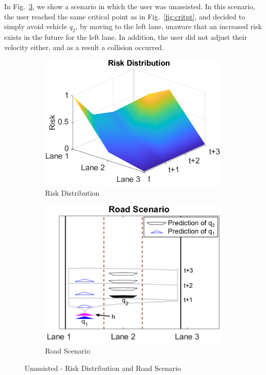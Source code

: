\documentclass[letterpaper, 10 pt, conference]{ieeeconf}  %
\begin{document}
In Fig.~\ref{fig:noassist}, we show a scenario in which the user was unassisted. In this scenario, the user reached the same critical point as in Fig.~\ref{fig:critpt}, and decided to simply avoid vehicle $q_2$, by moving to the left lane, unaware that an increased risk exists in the future for the left lane. In addition, the user did not adjust their velocity either, and as a result a collision occurred.

\begin{figure}[h]
\centering
\begin{subfigure}{.54\linewidth}
  \centering
  \includegraphics[width=\linewidth]{fig/noassist_rd.png}
  \caption{Risk Distribution}
  \label{fig:noasstrd}
\end{subfigure}%
\begin{subfigure}{.46\linewidth}
  \centering
  \includegraphics[width=\linewidth]{fig/noassist_rs.png}
  \caption{Road Scenario}
  \label{fig:noasstrs}
\end{subfigure}
\caption{Unassisted - Risk Distribution and Road Scenario} \label{fig:noassist}
\end{figure}
\end{document}
